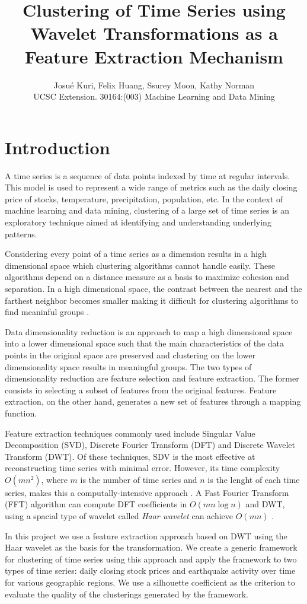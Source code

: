 \documentclass{article}
\title{Clustering of Time Series using Wavelet Transformations as a Feature Extraction Mechanism}
\author{\textsf{Josu\'e Kuri, Felix Huang, Ssurey Moon, Kathy Norman}\\UCSC Extension. 30164:(003) Machine Learning and Data Mining}
\begin{document}
\maketitle

\section{Introduction}
A time series is a sequence of data points indexed by time at regular intervals. This model is used to represent a wide range of metrics such as the daily closing price of stocks, temperature, precipitation, population, etc. In the context of machine learning and data mining, clustering of a large set of time series is an exploratory technique aimed at identifying and understanding underlying patterns.

Considering every point of a time series as a dimension results in a high dimensional space which clustering algorithms cannot handle easily. These algorithms depend on a distance measure as a basis to maximize cohesion and separation. In a high dimensional space, the contrast between the nearest and the farthest neighbor becomes smaller making it difficult for clustering algorithms to find meaninful groups \cite{BGRS99}.

Data dimensionality reduction is an approach to map a high dimensional space into a lower dimensional space such that the main characteristics of the data points in the original space are preserved and clustering on the lower dimensionality space results in meaningful groups. The two types of dimensionality reduction are feature selection and feature extraction. The former consists in selecting a subset of features from the original features. Feature extraction, on the other hand, generates a new set of features through a mapping function.

Feature extraction techniques commonly used include Singular Value Decomposition (SVD), Discrete Fourier Transform (DFT) and Discrete Wavelet Transform (DWT). Of these techniques, SDV is the most effective at reconstructing time series with minimal error. However, its time complexity $O(mn^2)$, where $m$ is the number of time series and $n$ is the lenght of each time series, makes this a computally-intensive approach \cite{ZHZL06}. A Fast Fourier Transform (FFT) algorithm can compute DFT coefficients in $O(mn \log n)$ and DWT, using a spacial type of wavelet called {\em Haar wavelet} can achieve $O(mn)$ \cite{ZHZL06}.

In this project we use a feature extraction approach based on DWT using the Haar wavelet as the basis for the transformation. We create a generic framework for clustering of time series using this approach and apply the framework to two types of time series: daily closing stock prices and earthquake activity over time for various geographic regions. We use a silhouette coefficient as the criterion to evaluate the quality of the clusterings generated by the framework.
\end{document}
